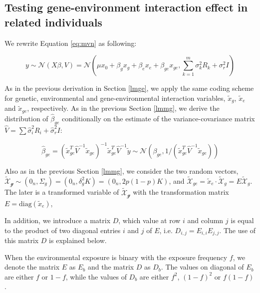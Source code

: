 \documentclass[]{book}
\theoremstyle{definition}
\theoremstyle{definition}
\theoremstyle{definition}
\theoremstyle{remark}
\begin{document}
\subsection{Testing gene-environment interaction effect in related
individuals}\label{lmmge}

We rewrite Equation \eqref{eq:mvn} as following:

\begin{equation} 
  y \sim \mathcal{N} (X \beta, V) = \mathcal{N} (\mu x_0 + \beta_g x_g + \beta_e x_e + \beta_{ge} x_{ge}, \sum_{k=1}^{m}{\sigma_k^2 R_k} + \sigma_r^2 I) 
\label{eq:lmmge}
\end{equation}

As in the previous derivation in Section \ref{lmge}, we apply the same
coding scheme for genetic, environmental and gene-environmental
interaction variables, \(\tilde{x}_g\), \(\tilde{x}_e\) and
\(\tilde{x}_{ge}\), respectively. As in the previous Section \ref{lmmg},
we derive the distribution of \(\hat{\beta}_{ge}\) conditionally on the
estimate of the variance-covariance matrix
\(\hat{V} = \sum{\hat{\sigma}_i^2 R_i} + \hat{\sigma}_r^2 I\):

\begin{equation} 
  \hat{\beta}_{ge}  = (\tilde{x}_{ge}^T \hat{V}^{-1} \tilde{x}_{ge})^{-1} \tilde{x}_{ge}^T \hat{V}^{-1} \tilde{y} \sim \mathcal{N} (\beta_{ge}, 1 / (\tilde{x}_{ge}^T \hat{V}^{-1} \tilde{x}_{ge}))
\label{eq:betahatlmmge}
\end{equation}

Also as in the previous Section \ref{lmmg}, we consider the two random
vectors,
\(\mathcal{\tilde{X}_g} \sim (0_n, \Sigma_g) = (0_n, \delta_g^2 K) = (0_n, 2 p (1-p) K)\),
and
\(\mathcal{\tilde{X}}_{ge} = \tilde{x}_e \cdot \mathcal{\tilde{X}}_g = E \mathcal{\tilde{X}}_g\).
The later is a transformed variable of \(\mathcal{\tilde{X}_g}\) with
the transformation matrix \(E = \mathrm{diag}(\tilde{x}_e)\),

In addition, we introduce a matrix \(D\), which value at row \(i\) and
column \(j\) is equal to the product of two diagonal entries \(i\) and
\(j\) of \(E\), i.e. \(D_{i,j} = E_{i,i} E_{j,j}\). The use of this
matrix \(D\) is explained below.

When the environmental exposure is binary with the exposure frequency
\(f\), we denote the matrix \(E\) as \(E_b\) and the matrix \(D\) as
\(D_b\). The values on diagonal of \(E_b\) are either \(f\) or
\(1 - f\), while the values of \(D_b\) are either \(f^2\), \((1 - f)^2\)
or \(f (1 - f)\).
\end{document}
